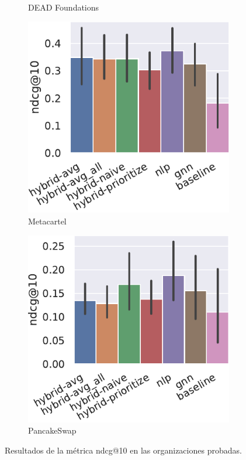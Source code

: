 \begin{figure}[t]
\begin{subfigure}{.24\linewidth}
        \caption{DEAD Foundations}
        \label{fig:all-results-ndcg-dead_foundation}
    \end{subfigure}\hfill\begin{subfigure}{.24\linewidth}
        \includegraphics[width=\linewidth]{figures/resultados/7_all-metrics-MetaCartel - MetaCartel Ventures-ndcg@10.pdf}
        \caption{Metacartel}
    \end{subfigure}\hfill\begin{subfigure}{.24\linewidth}
        \includegraphics[width=\linewidth]{figures/resultados/7_all-metrics-PancakeSwap-ndcg@10.pdf}
        \caption{PancakeSwap}
    \end{subfigure}
    \caption{Resultados de la métrica ndcg@10 en las organizaciones probadas.}
    \label{fig:all-results-ndcg}
\end{figure}

